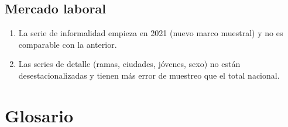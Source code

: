 \section{Mercado laboral}
\begin{enumerate}
\item La serie de informalidad empieza en 2021 (nuevo marco muestral) y no es comparable con la anterior.
\item Las series de detalle (ramas, ciudades, jóvenes, sexo) no están desestacionalizadas y tienen más error de
  muestreo que el total nacional.
\end{enumerate}

\chapter{Glosario}
\label{es:r:glosario}


